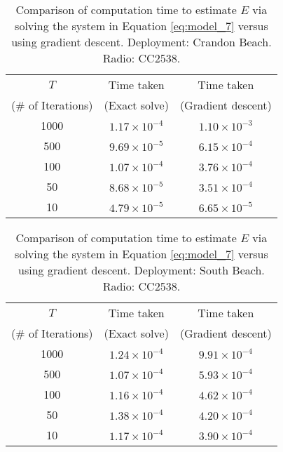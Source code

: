 \begin{table}[h!]
    \centering
    \caption{Comparison of computation time to estimate $E$ via solving the system in Equation \ref{eq:model_7} versus using gradient descent. Deployment:  Crandon Beach. Radio: CC2538.}
    \label{tab:time_comparison_cb}
    \begin{tabular}{|c|c|c|}
        \hline
        $T$ & Time taken  & Time taken  \\ 
         (\# of Iterations) & (Exact solve) & (Gradient descent) \\ \hline
        1000 & $1.17\times 10^{-4}$ & $1.10\times 10^{-3}$ \\ \hline
        500  & $9.69\times 10^{-5}$ & $6.15\times 10^{-4}$ \\ \hline
        100  & $1.07\times 10^{-4}$ & $3.76\times 10^{-4}$ \\ \hline
        50   &  $8.68\times 10^{-5}$ & $3.51\times 10^{-4}$ \\ \hline
        10   & $4.79\times 10^{-5}$ & $6.65\times 10^{-5}$ \\ \hline
  \end{tabular}
\end{table}

\begin{table}[h!]
    \centering
    \caption{Comparison of computation time to estimate $E$ via solving the system in Equation \ref{eq:model_7} versus using gradient descent. Deployment:  South Beach. Radio: CC2538.}
    \label{tab:time_comparison_sb}
    \begin{tabular}{|c|c|c|}
        \hline
        $T$ & Time taken  & Time taken  \\ 
       (\# of Iterations) & (Exact solve) & (Gradient descent) \\ \hline
        1000 & $1.24\times 10^{-4}$ & $9.91\times 10^{-4}$ \\ \hline
        500  & $1.07\times 10^{-4}$ & $5.93\times 10^{-4}$ \\ \hline
        100  & $1.16\times 10^{-4}$ & $4.62\times 10^{-4}$ \\ \hline
        50   &  $1.38\times 10^{-4}$ & $4.20\times 10^{-4}$ \\ \hline
        10   & $1.17\times 10^{-4}$ & $3.90\times 10^{-4}$ \\ \hline
  \end{tabular}
\end{table}

